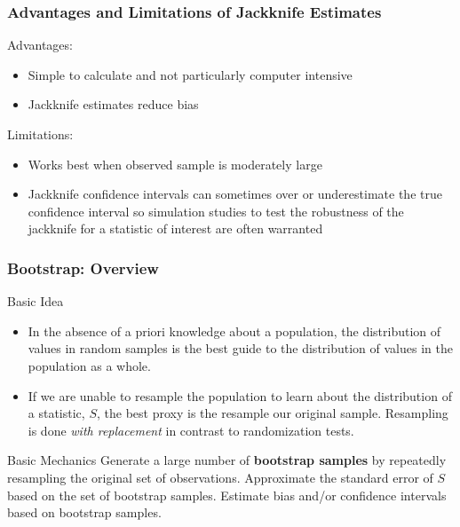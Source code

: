 \documentclass{beamer}
\begin{document}
\begin{frame}
  \frametitle{Advantages and Limitations of Jackknife Estimates}

Advantages:
\begin{itemize}
    \item Simple to calculate and not particularly computer intensive
    \item Jackknife estimates reduce bias
\end{itemize}

Limitations:
\begin{itemize}
    \item Works best when observed sample is moderately large
    \item Jackknife confidence intervals can sometimes over or underestimate the true confidence interval so simulation studies to test the robustness of the jackknife for a statistic of interest are often warranted
\end{itemize}

\end{frame}


\begin{frame}
  \frametitle{Bootstrap: Overview}

\begin{block}{Basic Idea}
\begin{itemize}
    \item In the absence of a priori knowledge about a population, the distribution of values in random samples is the best guide to the distribution of values in the population as a whole.

    \item If we are unable to resample the population to learn about the distribution of a statistic, $S$, the best proxy is the resample our original sample. Resampling is done \emph{with replacement} in contrast to randomization tests.
\end{itemize}
\end{block}


\begin{block}{Basic Mechanics}
Generate a large number of \textbf{bootstrap samples} by repeatedly resampling the original set of observations.  Approximate the standard error of $S$ based on the set of bootstrap samples. Estimate bias and/or confidence intervals based on bootstrap samples.
\end{block}

\end{frame}
\end{document}
